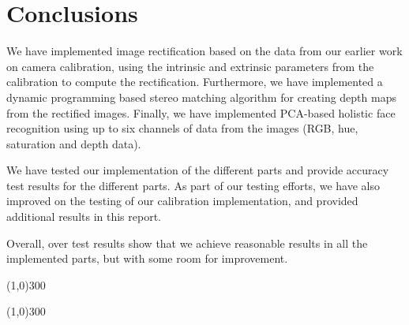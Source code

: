 
\section{Conclusions}
\label{sec:conclusions}
We have implemented image rectification based on the data from our earlier work
on camera calibration, using the intrinsic and extrinsic parameters from the
calibration to compute the rectification. Furthermore, we have implemented a
dynamic programming based stereo matching algorithm for creating depth maps from
the rectified images. Finally, we have implemented PCA-based holistic face
recognition using up to six channels of data from the images (RGB, hue,
saturation and depth data).

We have tested our implementation of the different parts and provide accuracy
test results for the different parts. As part of our testing efforts, we have
also improved on the testing of our calibration implementation, and provided
additional results in this report.

Overall, over test results show that we achieve reasonable results in all the
implemented parts, but with some room for improvement.

\begin{center}
\line(1,0){300}
\end{center}

\begin{center}
\line(1,0){300}
\end{center}
